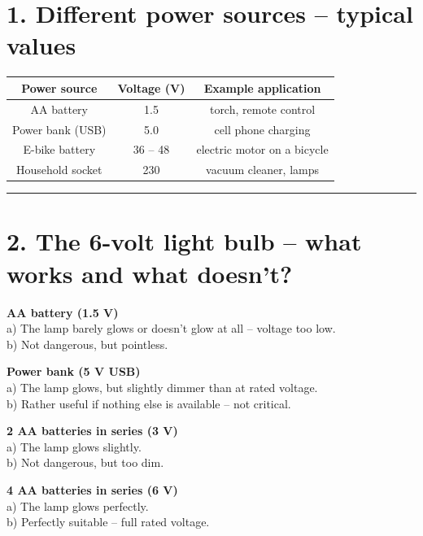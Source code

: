 \documentclass[a4paper,12pt]{article}
\begin{document}
	
	


	
	\section*{1. Different power sources – typical values}
	
	\begin{center}
		\begin{tabular}{ccc}
			\toprule
			\textbf{Power source} & \textbf{Voltage (V)} & \textbf{Example application} \\
			\midrule
			AA battery & 1.5 & torch, remote control \\
			Power bank (USB) & 5.0 & cell phone charging \\
			E-bike battery & 36 – 48 & electric motor on a bicycle \\
			Household socket & 230 & vacuum cleaner, lamps \\
			\bottomrule
		\end{tabular}
	\end{center}
	
	\hrule
	
	\section*{2. The 6-volt light bulb – what works and what doesn't?}
		
		\textbf{AA battery (1.5 V)}\\
		a) The lamp barely glows or doesn't glow at all – voltage too low.\\
		b) Not dangerous, but pointless.
		
		\textbf{Power bank (5 V USB)}\\
		a) The lamp glows, but slightly dimmer than at rated voltage.\\
		b) Rather useful if nothing else is available – not critical.
		
		\textbf{2 AA batteries in series (3 V)}\\
		a) The lamp glows slightly.\\
		b) Not dangerous, but too dim.
		
		\textbf{4 AA batteries in series (6 V)}\\
		a) The lamp glows perfectly.\\
		b) Perfectly suitable – full rated voltage.
		
\end{document}
